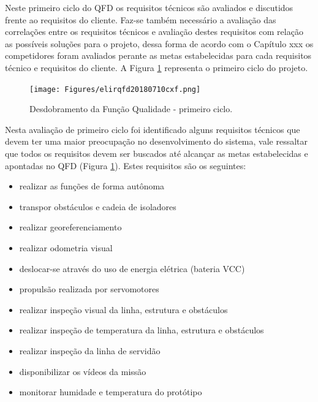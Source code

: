 Neste primeiro ciclo do QFD os requisitos técnicos são avaliados e discutidos frente ao requisitos do cliente. Faz-se também necessário a avaliação das correlações entre os requisitos técnicos e avaliação destes requisitos com relação as possíveis soluções para o projeto, dessa forma de acordo com o Capítulo xxx os competidores foram avaliados perante as metas estabelecidas para cada requisitos técnico e requisitos do cliente.
A Figura \ref{fig_qfd1} representa o primeiro ciclo do projeto.

\begin{figure}[htb]
	\begin{center}
		\texttt{[image: Figures/elirqfd20180710cxf.png]}
	\end{center}
	\caption{Desdobramento da Função Qualidade - primeiro ciclo.}
	\label{fig_qfd1}
\end{figure}

Nesta avaliação de primeiro ciclo foi identificado alguns requisitos técnicos que devem ter uma maior preocupação no desenvolvimento do sistema, vale ressaltar que todos os requisitos devem ser buscados até alcançar as metas estabelecidas e apontadas no QFD (Figura \ref{fig_qfd1}).
Estes requisitos são os seguintes:
\begin{itemize}
	\item realizar as funções de forma autônoma	
	\item transpor obstáculos e cadeia de isoladores	
	\item realizar georeferenciamento	
	\item realizar odometria visual	
	\item deslocar-se através do  uso de energia elétrica (bateria VCC)	
	\item propulsão realizada por servomotores	
	\item realizar inspeção visual da linha, estrutura e obstáculos	
	\item realizar inspeção de temperatura da linha, estrutura e obstáculos	
	\item realizar inspeção da linha de servidão	
	\item disponibilizar os vídeos da missão	
	\item monitorar humidade e temperatura do protótipo	
\end{itemize}


